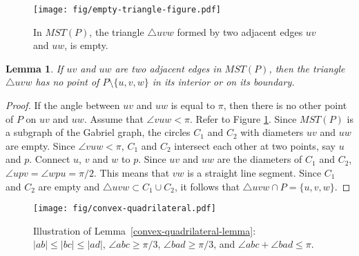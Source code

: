 \documentclass[11pt,a4paper]{article}
\newtheorem{lemma}{Lemma}
\begin{document}
\begin{figure}[ht]
  \centering
    \texttt{[image: fig/empty-triangle-figure.pdf]}
  \caption{In $MST(P)$, the triangle $\bigtriangleup uvw$ formed by two adjacent edges $uv$ and $uw$, is empty.}
\label{empty-triangle-figure}
\end{figure}
\begin{lemma}
\label{empty-triangle-lemma}
If $uv$ and $uw$ are two adjacent edges in $MST(P)$, then the triangle $\bigtriangleup uvw$ has no point of $P\setminus\{u, v, w\}$ in its interior or on its boundary.
\end{lemma}
\begin{proof}
If the angle between $uv$ and $uw$ is equal to $\pi$, then there is no other point of $P$ on $uv$ and $uw$. Assume that $\angle vuw < \pi$. Refer to Figure \ref{empty-triangle-figure}. Since $MST(P)$ is a subgraph of the Gabriel graph, the circles $C_1$ and $C_2$ with diameters $uv$ and $uw$ are empty. Since $\angle vuw < \pi$, $C_1$ and $C_2$ intersect each other at two points, say $u$ and $p$. Connect $u$, $v$ and $w$ to $p$. Since $uv$ and $uw$ are the diameters of $C_1$ and $C_2$, $\angle upv=\angle wpu=\pi/2$.
This means that $vw$ is a straight line segment. Since $C_1$ and $C_2$ are empty and $\bigtriangleup uvw \subset C_1 \cup C_2$, it follows that $\bigtriangleup uvw \cap P = \{u, v, w\}$.
\end{proof}

\begin{figure}[htb]
  \centering
  \texttt{[image: fig/convex-quadrilateral.pdf]}
  \caption{Illustration of Lemma~\ref{convex-quadrilateral-lemma}: $|ab|\le|bc|\le|ad|$, $\angle abc\ge \pi/3$, $\angle bad\ge \pi/3$, and $\angle abc + \angle bad \le \pi$.}
\label{convex-quadrilateral-fig}
\end{figure}
\end{document}
